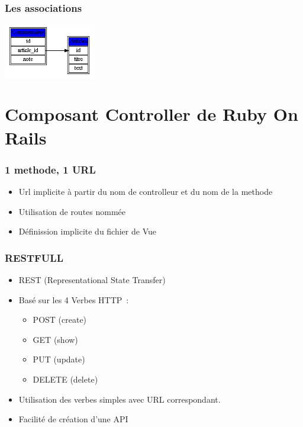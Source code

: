 \documentclass{beamer}
\begin{document}
\begin{frame}
    \frametitle{Les associations}
    \begin{center}
        \includegraphics[width=40mm]{article_commentaire.png}
        
    \end{center}
\end{frame}


\section{Composant Controller de Ruby On Rails}

\begin{frame}
    \frametitle{1 methode, 1 URL}
    \begin{itemize}
        \item Url implicite à partir du nom de controlleur et du nom de la
        methode
        \item Utilisation de routes nommée
        \item Définission implicite du fichier de Vue
    \end{itemize}
\end{frame}

\begin{frame}
    \frametitle{RESTFULL}

    \begin{itemize}
        \item REST (Representational State Transfer)
        \item Basé sur les 4 Verbes HTTP~:
            \begin{itemize}
                \item POST (create)
                \item GET (show)
                \item PUT (update)
                \item DELETE (delete)
            \end{itemize}
        \item Utilisation des verbes simples avec URL correspondant.
        \item Facilité de création d'une API
    \end{itemize}
\end{frame}
\end{document}
